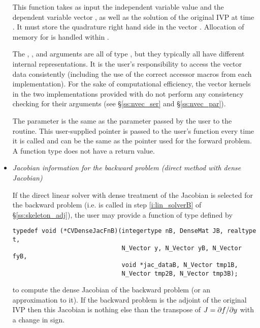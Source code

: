 \begin{itemize}
  This function takes as input the 
  independent variable value  and the dependent variable vector ,
  as well as the solution of the original IVP  at time .  
  It must store the quadrature right hand side in the vector .  
  Allocation of memory for  is handled within {\cvodes}.
  
  The , , and  arguments are all of type ,
  but they  typically all have different internal representations. It is the user's 
  responsibility to access the vector data consistently (including the use of the 
  correct accessor macros from each {\nvector} implementation). For the sake of 
  computational efficiency, the vector kernels in the two {\nvector} implementations 
  provided with {\cvodes} do not perform any consistency checking for their 
   arguments (see \S\ref{ss:nvec_ser} and \S\ref{ss:nvec_par}).

  The  parameter is the same as the  parameter passed by 
  the user to the  routine. This user-supplied pointer is passed to 
  the user's  function every time it is called and can be the same as the 
   pointer used for the forward problem.
  A  function type does not have a return value.

\item {\em Jacobian information for the backward problem
    (direct method with dense Jacobian)}
  
  If the direct linear solver with dense treatment of the Jacobian is selected
  for the backward problem (i.e.  is called in step \ref{i:lin_solverB} 
  of \S\ref{ss:skeleton_adj}), the user may provide a function of type  
  defined by
\begin{verbatim}
typedef void (*CVDenseJacFnB)(integertype nB, DenseMat JB, realtype t, 
                              N_Vector y, N_Vector yB, N_Vector fyB,
                              void *jac_dataB, N_Vector tmp1B,
                              N_Vector tmp2B, N_Vector tmp3B);
\end{verbatim}
  to compute the dense Jacobian of the backward problem (or an approximation
  to it). If the backward problem is the adjoint of the original IVP then
  this Jacobian is nothing else than the transpose of $J = \partial f / \partial y$ with
  a change in sign.


\end{itemize}

